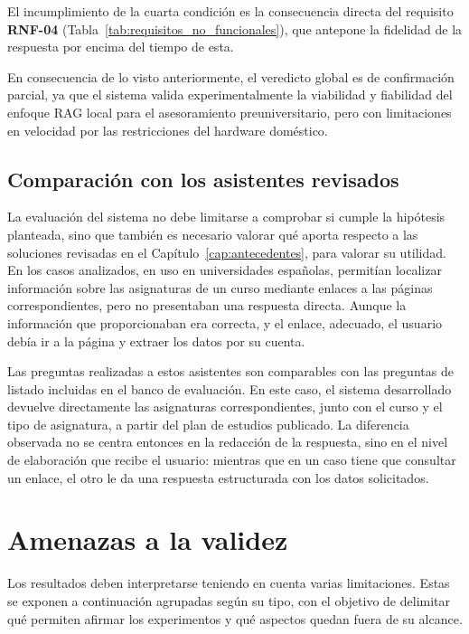 El incumplimiento de la cuarta condición es la consecuencia directa del requisito \textbf{RNF-04} (Tabla~\ref{tab:requisitos_no_funcionales}), que antepone la fidelidad de la respuesta por encima del tiempo de esta.

En consecuencia de lo visto anteriormente, el veredicto global es de confirmación parcial, ya que el sistema valida experimentalmente la viabilidad y fiabilidad del enfoque RAG local para el asesoramiento preuniversitario, pero con limitaciones en velocidad por las restricciones del hardware doméstico.


\subsection[Comparación con los asistentes revisados]{Comparación con los asistentes revisados}
\label{secc:discusion_estado_arte}

La evaluación del sistema no debe limitarse a comprobar si
cumple la hipótesis planteada, sino que también es necesario valorar qué aporta respecto
a las soluciones revisadas en el Capítulo~\ref{cap:antecedentes}, para valorar su utilidad. En los casos analizados, en uso en universidades españolas, permitían localizar información sobre las asignaturas de un curso mediante enlaces a las páginas correspondientes, pero no presentaban una respuesta directa. Aunque la información que proporcionaban era correcta, y el enlace, adecuado, el usuario debía ir a la página y extraer los datos por su cuenta.

Las preguntas realizadas a estos asistentes son comparables con las preguntas de listado incluidas en el banco de evaluación. En este caso, el sistema desarrollado devuelve directamente las asignaturas correspondientes, junto con el curso y el tipo de asignatura, a partir del plan de estudios publicado. La diferencia observada no se centra entonces en la redacción de la respuesta, sino en el nivel de elaboración que recibe el usuario: mientras que en un caso tiene que consultar un enlace, el otro le da una respuesta estructurada con los datos solicitados.



\section{Amenazas a la validez}
\label{secc:amenazas_validez}

Los resultados deben interpretarse teniendo en cuenta
varias limitaciones. Estas se exponen a continuación agrupadas según su tipo, con el objetivo de delimitar qué permiten afirmar
los experimentos y qué aspectos quedan fuera de su alcance.

